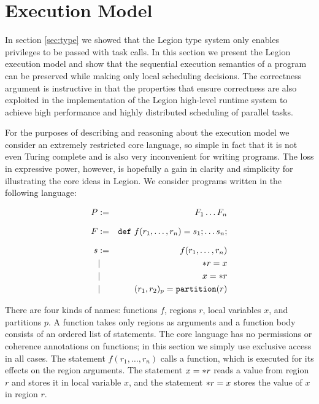 
\section{Execution Model}
\label{sec:exec}


In section \ref{sec:type} we showed that the Legion type system
only enables privileges to be passed with task calls. 
 In this
section we present the Legion execution model and show that
the sequential execution 
semantics of a program can be preserved while making only local scheduling
decisions.
  The correctness argument is
instructive in that the properties that ensure correctness are also
exploited in the implementation of the Legion high-level runtime
system to achieve high performance and highly distributed scheduling
of parallel tasks.

For the purposes of describing and reasoning about the
execution model we consider an extremely restricted core language, so
simple in fact that it is not even Turing complete and is also very
inconvenient for writing programs.  The loss in expressive power, however,
is hopefully a gain in clarity and simplicity for illustrating the core ideas in
Legion.    We consider programs written in the following language:

\begin{eqnarray*}
P & := & F_1 \ldots F_n \\[.1in]
F & := & \mbox{\tt def}\ f(r_1,\ldots,r_n) =   s_1; \ldots s_n; \\[.1in]
s & := & f(r_1,\ldots,r_n) \\
&| & \ast r = x \\
& | & x = \ast r \\
&| & (r_1, r_2)_{p} = \mbox{\tt partition}(r) \\ 
\end{eqnarray*}

There are four kinds of names: functions $f$, regions $r$, local
variables $x$, and partitions $p$.  A function takes only regions as
arguments and a function body consists of an ordered list of
statements.  The core language has no permissions or coherence annotations
on functions; in this section we simply use exclusive access in all cases.
 The statement $f(r_1,\ldots,r_n)$ calls a function, which
is executed for its effects on the region arguments.  The statement $x
= \ast r$ reads a value from region $r$ and stores it in local
variable $x$, and the statement $\ast r = x$ stores the value of $x$
in region $r$.  

